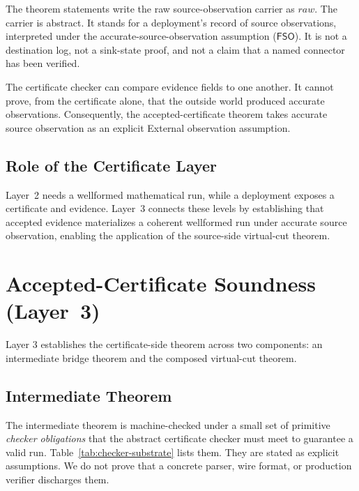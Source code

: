 \documentclass[letterpaper,10pt,twocolumn]{article}
\newcommand{\RawObs}{\mathit{raw}}
\newcommand{\FSO}{\mathsf{FSO}}
\begin{document}
The theorem statements write the raw source-observation carrier as
$\RawObs$. The carrier is abstract. It stands for a deployment's record
of source observations, interpreted under the accurate-source-observation
assumption ($\FSO$). It is not a
destination log, not a sink-state proof, and not a claim that a named
connector has been verified.

The certificate checker can compare evidence fields to one another. It
cannot prove, from the certificate alone, that the outside world
produced accurate observations. Consequently, the accepted-certificate
theorem takes accurate source observation as an explicit External observation
assumption.

\subsection{Role of the Certificate Layer}\label{why-this-layer-exists}

Layer~2 needs a wellformed mathematical run, while a deployment exposes
a certificate and evidence. Layer~3 connects these levels by establishing that
accepted evidence materializes a coherent wellformed run under accurate
source observation, enabling the application of the source-side virtual-cut
theorem.

\section{Accepted-Certificate Soundness \mbox{(Layer 3)}}\label{accepted-certificate-soundness-layer-3}

Layer 3 establishes the certificate-side theorem across two components: an
intermediate bridge theorem and the composed virtual-cut theorem.

\subsection{Intermediate Theorem}\label{intermediate-theorem}

The intermediate theorem is machine-checked under a small set of primitive
\emph{checker obligations} that the abstract certificate checker must meet
to guarantee a valid run. Table~\ref{tab:checker-substrate} lists them.
They are stated as explicit assumptions. We do not prove that a concrete
parser, wire format, or production verifier discharges them.
\end{document}
